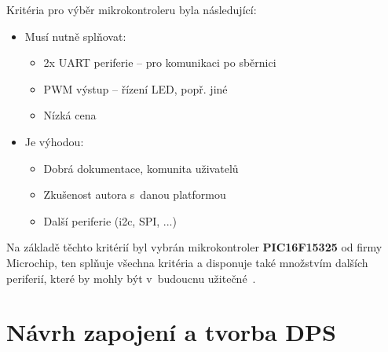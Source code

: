         Kritéria pro výběr mikrokontroleru byla následující:
        \begin{itemize}
            \item Musí nutně splňovat:
            \begin{itemize}
                \item 2x UART periferie -- pro komunikaci po sběrnici 
                \item PWM výstup -- řízení LED, popř. jiné
                \item Nízká cena 
            \end{itemize}
            \item Je výhodou:
            \begin{itemize}
                \item Dobrá dokumentace, komunita uživatelů
                \item Zkušenost autora s~danou platformou
                \item Další periferie (\acs{i2c}, SPI, ...)
            \end{itemize}
        \end{itemize}

        Na základě těchto kritérií byl vybrán mikrokontroler \textbf{PIC16F15325} od firmy Microchip, ten splňuje všechna kritéria a disponuje také množstvím dalších periferií, které by mohly být v~budoucnu užitečné~\cite{PIC16F15325}.

        \section{Návrh zapojení a tvorba DPS}

